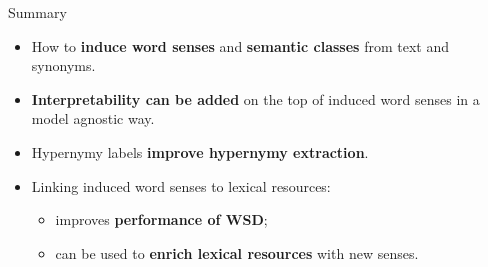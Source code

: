 \documentclass{beamer}
\begin{document}
\begin{frame}{Summary}

\begin{itemize}
	\item How to \textbf{induce word senses} and \textbf{semantic classes} from text and synonyms.
    \vspace{1em}
    \pause
    
	\item \textbf{Interpretability can be added} on the top of induced word senses in a model agnostic way. 
	\vspace{1em}
    \pause
	
	\item Hypernymy labels \textbf{improve hypernymy extraction}. 
	\vspace{1em}
	\pause
	
	\item Linking induced word senses to lexical resources:
	\begin{itemize} 
		\item improves \textbf{performance of WSD};
		\item can be used to \textbf{enrich lexical resources} with new senses.
	\end{itemize}
	
	
\end{itemize}


\end{frame}
\end{document}
